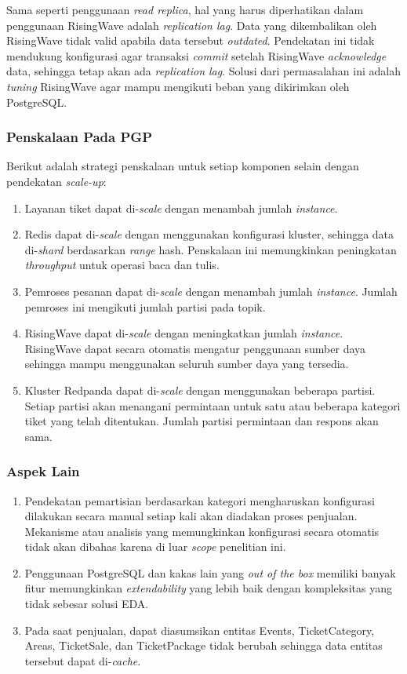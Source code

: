 Sama seperti penggunaan \textit{read replica}, hal yang harus diperhatikan dalam penggunaan RisingWave adalah \textit{replication lag}. Data yang dikembalikan oleh RisingWave tidak valid apabila data tersebut \textit{outdated}. Pendekatan ini tidak mendukung konfigurasi agar transaksi \textit{commit} setelah RisingWave \textit{acknowledge} data, sehingga tetap akan ada \textit{replication lag}. Solusi dari permasalahan ini adalah \textit{tuning} RisingWave agar mampu mengikuti beban yang dikirimkan oleh PostgreSQL.

\subsubsection{Penskalaan Pada PGP}

Berikut adalah strategi penskalaan untuk setiap komponen selain dengan pendekatan \textit{scale-up}:

\begin{enumerate}
    \item Layanan tiket dapat di-\textit{scale} dengan menambah jumlah \textit{instance}.
    \item Redis dapat di-\textit{scale} dengan menggunakan konfigurasi kluster, sehingga data di-\textit{shard} berdasarkan \textit{range} hash. Penskalaan ini memungkinkan peningkatan \textit{throughput} untuk operasi baca dan tulis.
    \item Pemroses pesanan dapat di-\textit{scale} dengan menambah jumlah \textit{instance}. Jumlah pemroses ini mengikuti jumlah partisi pada topik.
    \item RisingWave dapat di-\textit{scale} dengan meningkatkan jumlah \textit{instance}. RisingWave dapat secara otomatis mengatur penggunaan sumber daya sehingga mampu menggunakan seluruh sumber daya yang tersedia.
    \item Kluster Redpanda dapat di-\textit{scale} dengan menggunakan beberapa partisi. Setiap partisi akan menangani permintaan untuk satu atau beberapa kategori tiket yang telah ditentukan. Jumlah partisi permintaan dan respons akan sama.
\end{enumerate}

\subsubsection{Aspek Lain}

\begin{enumerate}
    \item Pendekatan pemartisian berdasarkan kategori mengharuskan konfigurasi dilakukan secara manual setiap kali akan diadakan proses penjualan. Mekanisme atau analisis yang memungkinkan konfigurasi secara otomatis tidak akan dibahas karena di luar \textit{scope} penelitian ini.
    \item Penggunaan PostgreSQL dan kakas lain yang \textit{out of the box} memiliki banyak fitur memungkinkan \textit{extendability} yang lebih baik dengan kompleksitas yang tidak sebesar solusi EDA.
    \item Pada saat penjualan, dapat diasumsikan entitas Events, TicketCategory, Areas, TicketSale, dan TicketPackage tidak berubah sehingga data entitas tersebut dapat di-\textit{cache}.
\end{enumerate}